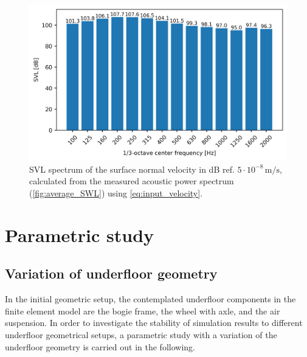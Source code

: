 \begin{figure}
	\centering
	\includegraphics{fig/chap4/input_SVL.png}
	\caption{SVL spectrum of the surface normal velocity in dB ref. $5\cdot10^{-8}\,\text{m/s}$, calculated from the measured acoustic power spectrum (\cref{fig:average_SWL}) using \cref{eq:input_velocity}.}
	\label{fig:input_SVL}
\end{figure}

\newpage
\section{Parametric study}
\label{section:parametric_study}
\subsection{Variation of underfloor geometry}
\label{section:variation_geometry}

In the initial geometric setup, the contemplated underfloor components in the finite element model are the bogie frame, the wheel with axle, and the air suspension. In order to investigate the stability of simulation results to different underfloor geometrical setups, a parametric study with a variation of the underfloor geometry is carried out in the following.


